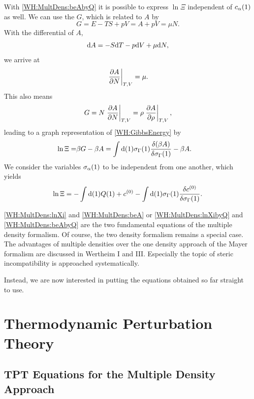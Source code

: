 \documentclass[8.5pt,twoside,twocolumn]{article}
\newcommand\di{\te{d}}
\newcommand\cze{\enmat{c^{(0)}}}
\newcommand\inon{\enmat{\int\di(1)}}
\newcommand\calp{\enmat{c_{\al}}}
\newcommand\sal{\enmat{\si_{\al}}}
\theoremstyle{standard}
\begin{document}
With \eqref{WH:MultDens:beAbyQ} it is possible to express $\ln\Xi$ independent of $\calp(1)$ as well.
We can use the  $G$, which is related to $A$ by
\begin{equation}
G=E-TS+pV=A+pV=\mu N.
\label{WH:GibbsEnergy}
\end{equation}
With the differential of $A$,
\begin{equation}
\di A=-S \di T - p \di V + \mu \di N, 
\end{equation} 
we arrive at
\begin{equation}
\left. \frac {\partial{A}} {\partial{N}} \right|_{T,V} = \mu.
\end{equation}
This also means
\begin{equation}
G=N \left. \frac {\partial{A}} {\partial{N}} \right|_{T,V} = \rho \left. \frac {\partial{A}} {\partial{\rho}} \right|_{T,V}, 
\end{equation}
leading to a graph representation of \eqref{WH:GibbsEnergy} by
\begin{equation}
\begin{aligned}
\ln\Xi =& \be G - \be A = \inon \siga(1) \delti{\rb{\be A}}{\siga(1)} - \be A.
\end{aligned}
\end{equation}
We consider the variables $\sal(1)$ to be independent from one another, which yields
\begin{equation}
\ln\Xi=-\inon Q(1) + \cze - \inon \siga(1)\delti{\cze}{\siga(1)}.
\label{WH:MultDens:lnXibyQ}
\end{equation} 

\eqref{WH:MultDens:lnXi} and \eqref{WH:MultDens:beA} or \eqref{WH:MultDens:lnXibyQ} and \eqref{WH:MultDens:beAbyQ}
are the two fundamental equations of the multiple density formalism. Of course, the
two density formalism remains a special case. The advantages of multiple densities over the
one density approach of the Mayer formalism are discussed in Wertheim I and III. Especially the topic of steric
incompatibility is approached systematically.

Instead, we are now interested in putting the equations obtained so far straight to use.


\section{Thermodynamic Perturbation Theory}
\label{TPT}
\subsection{TPT Equations for the Multiple Density Approach}
\label{TPT:intro}
\end{document}
